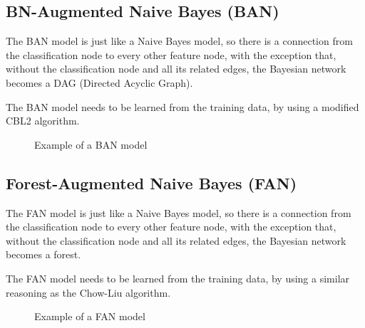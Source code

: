 \documentclass[twoside,twocolumn]{article}
\begin{document}
\subsection{BN-Augmented Naive Bayes (BAN)}

The BAN model is just like a Naive Bayes model, so there is a connection from the classification node to every other feature node, 
with the exception that, without the classification node and all its related edges, the Bayesian network becomes a DAG (Directed Acyclic Graph).

The BAN model needs to be learned from the training data, by using a modified CBL2 algorithm.

\begin{figure}[h]
  \caption{Example of a BAN model}
  \centering
\end{figure}

\subsection{Forest-Augmented Naive Bayes (FAN)}

The FAN model is just like a Naive Bayes model, so there is a connection from the classification node to every other feature node, 
with the exception that, without the classification node and all its related edges, the Bayesian network becomes a forest.

The FAN model needs to be learned from the training data, by using a similar reasoning as the Chow-Liu algorithm.

\begin{figure}[h]
  \caption{Example of a FAN model}
  \centering
\end{figure}
\end{document}
